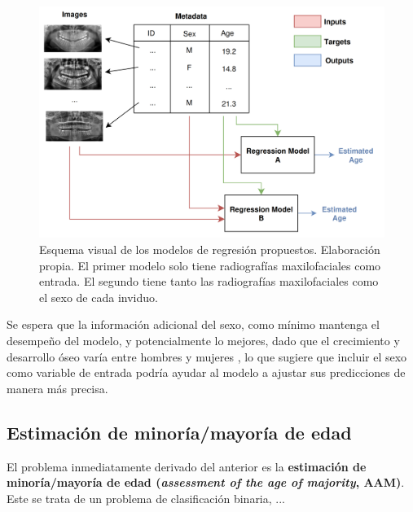 \begin{figure}[h]
    \centering
    \includegraphics[width=\textwidth]{capitulos/cap_04/imagenes/regression_problems.png}
    \caption[
        Esquema visual de los modelos de regresión propuestos. 
        Elaboración propia.
    ]{
        Esquema visual de los modelos de regresión propuestos. 
        Elaboración propia.
        El primer modelo solo tiene radiografías maxilofaciales como entrada. 
        El segundo tiene tanto las radiografías maxilofaciales como el sexo de cada inviduo. 
    } 
    \label{fig:regression_problems}
\end{figure}

Se espera que la información adicional del sexo, como mínimo mantenga el desempeño del modelo, y 
potencialmente lo mejores, dado que el crecimiento y desarrollo óseo varía entre hombres y mujeres
\cite{adserias2019, scheuer2000}, lo que sugiere que incluir el sexo como variable de entrada podría ayudar 
al modelo a ajustar sus predicciones de manera más precisa. 



\subsection{Estimación de minoría/mayoría de edad}

El problema inmediatamente derivado del anterior es la 
\textbf{estimación de minoría/mayoría de edad (\textit{assessment of the age of majority}, AAM)}.
Este se trata de un problema de clasificación binaria, ...



